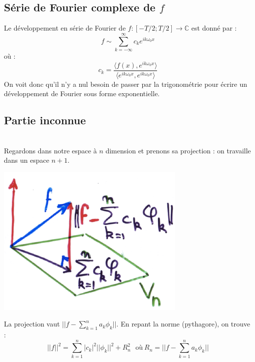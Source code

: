 \documentclass[11pt, a4paper, openany]{book}
\begin{document}
		\subsection{Série de Fourier complexe de $f$}
		Le développement en série de Fourier de $f :[-T/2; T/2] \rightarrow \mathbb{C}$ est donné par :
		\begin{equation}
			f \sim \sum_{k=-\infty}^\infty c_ke^{ik\omega_0x}
		\end{equation}
		où :
		\begin{equation}
			c_k = \dfrac{\langle f(x), e^{ik\omega_0x}\rangle}{\langle e^{ik\omega_0x}, e^{ik\omega_0x} \rangle}
		\end{equation}
		On voit donc qu'il n'y a nul besoin de passer par la trigonométrie pour écrire un développement de Fourier sous forme exponentielle.
									
		\subsection{Partie inconnue}
		\ \\
		Regardons dans notre espace à $n$ dimension et prenons sa projection : on travaille dans un espace $n+1$.
		\begin{center}
			\includegraphics[scale=0.55]{image17.png}
		\end{center}
		La projection vaut $||f - \sum_{k=1}^n a_k\phi_k||$. En repant la norme (pythagore), on trouve :
		\begin{equation}
			||f||^2 = \sum_{k=1}^n |c_k|^2||\phi_k||^2 + R_n^2\ \ \ \text{où}\ R_n = ||f - \sum_{k=1}^n a_k\phi_k||
		\end{equation}
									
\end{document}
